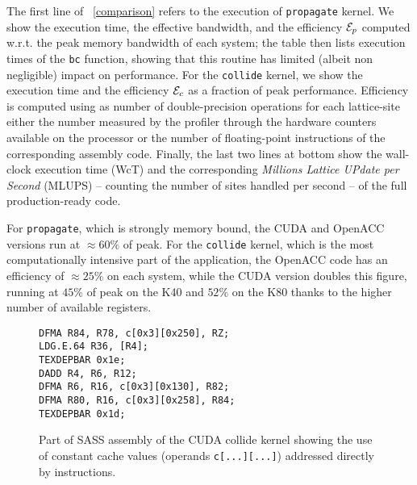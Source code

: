 \documentclass[times]{cpeauth}
\begin{document}
The first line of \tablename~\ref{comparison} refers to the execution of 
{\tt propagate} kernel.
% 
We show the execution time, the effective bandwidth, and the efficiency 
${\cal E}_p$ computed w.r.t. the peak memory bandwidth of each system; 
the table then lists execution times of the {\tt bc} function, showing 
that this routine has limited (albeit non negligible) impact on performance.
%
For the {\tt collide} kernel, we show the execution time and the efficiency 
${\cal E}_c$ as a fraction of peak performance.
%
Efficiency is computed using as number of double-precision operations 
for each lattice-site either the number measured by the profiler through 
the hardware counters available on the processor or 
the number of floating-point instructions of the corresponding assembly code. 
%
Finally, the last two lines at bottom show the wall-clock execution time (WcT) 
and the corresponding {\em Millions Lattice UPdate per Second} (MLUPS) 
-- counting the number of sites handled per second -- of the full 
production-ready code.

For {\tt propagate}, which is strongly memory bound, the CUDA and OpenACC 
versions run at $\approx 60\%$ of peak. 
%
For the {\tt collide} kernel, which is the most computationally intensive part 
of the application, the OpenACC code has an efficiency of $\approx 25\%$ on 
each system, while the CUDA version doubles this figure, running at $45\%$ 
of peak on the K40 and $52\%$ on the K80 thanks to the higher number of 
available registers.

%
\begin{figure}[t]
\centering
\begin{lstlisting}[language={},basicstyle=\footnotesize]
DFMA R84, R78, c[0x3][0x250], RZ;
LDG.E.64 R36, [R4];
TEXDEPBAR 0x1e;
DADD R4, R6, R12;
DFMA R6, R16, c[0x3][0x130], R82;
DFMA R80, R16, c[0x3][0x258], R84;
TEXDEPBAR 0x1d;
\end{lstlisting}
\caption{\label{fig:collide_sass} Part of SASS assembly of the CUDA collide 
kernel showing the use of constant cache values (operands {\tt c[...][...]}) 
addressed directly by instructions. 
}
\end{figure}
%
\end{document}
